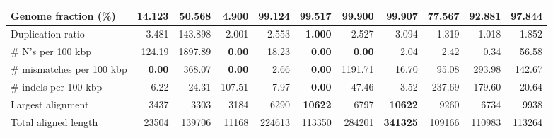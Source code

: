 \documentclass[12pt,a4paper]{article}
\begin{document}
\begin{table}[ht]
\begin{center}
\begin{tabular}{|l*{10}{|r}|}
Genome fraction (\%) & 14.123 & 50.568 & 4.900 & 99.124 & 99.517 & 99.900 & {\bf 99.907} & 77.567 & 92.881 & 97.844 \\ \hline
Duplication ratio & 3.481 & 143.898 & 2.001 & 2.553 & {\bf 1.000} & 2.527 & 3.094 & 1.319 & 1.018 & 1.852 \\ \hline
\# N's per 100 kbp & 124.19 & 1897.89 & {\bf 0.00} & 18.23 & {\bf 0.00} & {\bf 0.00} & 2.04 & 2.42 & 0.34 & 56.58 \\ \hline
\# mismatches per 100 kbp & {\bf 0.00} & 368.07 & {\bf 0.00} & 2.66 & {\bf 0.00} & 1191.71 & 16.70 & 95.08 & 293.98 & 142.67 \\ \hline
\# indels per 100 kbp & 6.22 & 24.31 & 107.51 & 7.97 & {\bf 0.00} & 47.46 & 3.52 & 237.69 & 179.60 & 20.64 \\ \hline
Largest alignment & 3437 & 3303 & 3184 & 6290 & {\bf 10622} & 6797 & {\bf 10622} & 9260 & 6734 & 9938 \\ \hline
Total aligned length & 23504 & 139706 & 11168 & 224613 & 113350 & 284201 & {\bf 341325} & 109166 & 110983 & 113264 \\ \hline
\end{tabular}
\end{center}
\end{table}
\end{document}
